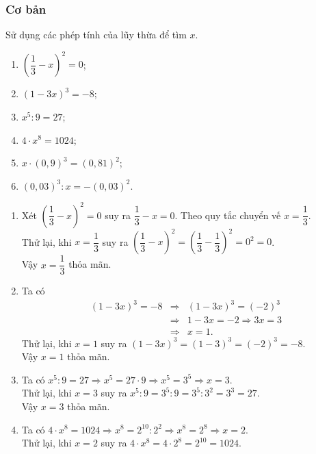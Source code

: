 \subsubsection{Cơ bản}
\begin{bt}%
	Sử dụng các phép tính của lũy thừa để tìm $x$.
	\begin{enumerate}
		\item $\left(\dfrac{1}{3} - x\right)^2 = 0$;
		\item $\left(1 - 3x\right)^3 = - 8$;
		\item $x^5\colon 9 = 27$;
		\item  $4\cdot x^{8} = 1024$;
		\item $x\cdot \left(0{,}9\right)^{3} = \left(0{,}81\right)^2$;
		\item $\left(0{,}03\right)^3\colon x = - \left(0{,}03\right)^2$.
	\end{enumerate}	
	\loigiai
	{\begin{enumerate}
			\item Xét $\left(\dfrac{1}{3} - x\right)^2 = 0$ suy ra $\dfrac{1}{3} - x = 0$. Theo quy tắc chuyển vế $x = \dfrac{1}{3}$.\\
			Thử lại, khi $x = \dfrac{1}{3}$ suy ra $\left(\dfrac{1}{3} - x\right)^2 = \left(\dfrac{1}{3} - \dfrac{1}{3}\right)^2 = 0^2 = 0$.\\
			Vậy $x = \dfrac{1}{3}$ thỏa mãn.
			\item Ta có
			\begin{eqnarray*}
				\left(1 - 3x\right)^3 = - 8 &\Rightarrow& \left(1 - 3x\right)^3 =  \left(-2\right)^3\\
				&\Rightarrow& 1 - 3x = - 2\Rightarrow 3x = 3\\
				&\Rightarrow&x = 1.
			\end{eqnarray*}
			Thử lại, khi $x = 1$ suy ra $\left(1 - 3x\right)^3 = \left(1 - 3\right)^3 = \left(- 2\right)^3 = - 8$.\\
			Vậy $x = 1$ thỏa mãn.
			\item Ta có $x^5\colon 9 = 27\Rightarrow x^5 = 27\cdot 9\Rightarrow x^5 = 3^5\Rightarrow x = 3$.\\
			Thử lại, khi $x = 3$ suy ra  $x^5\colon 9 = 3^5\colon 9 =  3^5\colon 3^2 = 3^3 = 27$.\\
			Vậy $x = 3$ thỏa mãn. 
			\item  Ta có $4\cdot x^{8} = 1024\Rightarrow x^8 = 2^{10}\colon 2^2\Rightarrow x^8 = 2^8\Rightarrow x = 2$.\\
			Thử lại, khi $x = 2$ suy ra $4\cdot x^{8} = 4\cdot 2^{8} = 2^{10} = 1024$.\\

\end{enumerate}}
\end{bt}
